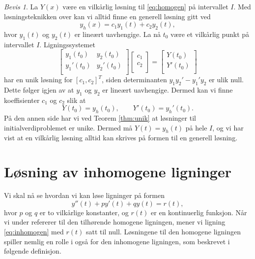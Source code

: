 \documentclass{article}
\theoremstyle{definition}
\theoremstyle{remark}
\newtheorem*{bevis}{Bevis}
\begin{document}
\begin{multicols*}{2}
\begin{bevis}
  La $Y(x)$ være en vilkårlig løsning til \eqref{eq:homogen} på intervallet $I$. Med løsningsteknikken over kan vi alltid finne en generell løsning gitt ved
  \begin{equation*}
    y_h(x) = c_1 y_1(t) + c_2 y_2(t),
  \end{equation*}
  hvor $y_1(t)$ og $y_2(t)$ er lineært uavhengige. La nå $t_0$ være et vilkårlig punkt på intervallet $I$. Ligningssystemet
  \begin{equation*}
    \begin{bmatrix}
      y_1(t_0) & y_2(t_0) \\
      y_1'(t_0) & y_2'(t_0) \\
    \end{bmatrix}
    \begin{bmatrix}
      c_1 \\
      c_2 \\
    \end{bmatrix}
    =
    \begin{bmatrix}
      Y(t_0) \\
      Y'(t_0) \\
    \end{bmatrix}
  \end{equation*}
  har en unik løsning for $[c_1, c_2]^T$, siden determinanten $y_1 y_2' - y_1' y_2$ er ulik null. Dette følger igjen av at $y_1$ og $y_2$ er lineært uavhengige. Dermed kan vi finne koeffisienter $c_1$ og $c_2$ slik at 
  \begin{equation*}
    Y(t_0) = y_h(t_0), \qquad Y'(t_0) = y_h'(t_0).
  \end{equation*}
  På den annen side har vi ved Teorem \ref{thm:unik} at løsninger til initialverdiproblemet er unike. Dermed må $Y(t) = y_h(t)$ på hele $I$, og vi har vist at en vilkårlig løsning alltid kan skrives på formen til en generell løsning.
\end{bevis}


\section*{Løsning av inhomogene ligninger}
Vi skal nå se hvordan vi kan løse ligninger på formen
\begin{equation} \label{eq:inhomogen}
    y''(t) + p y'(t) + q y(t) = r(t),
\end{equation}
hvor $p$ og $q$ er to vilkårlige konstanter, og $r(t)$ er en kontinuerlig funksjon. Når vi under refererer til den tilhørende homogene ligningen, mener vi ligning \eqref{eq:inhomogen} med $r(t)$ satt til null. Løsningene til den homogene ligningen spiller nemlig en rolle i også for den inhomogene ligningen, som beskrevet i følgende definisjon.


\end{multicols*}
\end{document}
